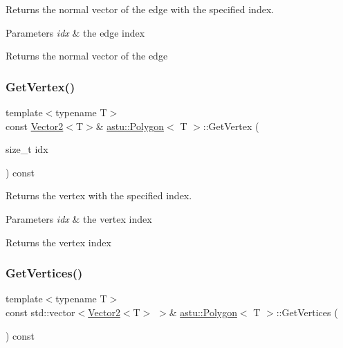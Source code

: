 Returns the normal vector of the edge with the specified index.


\begin{DoxyParams}{Parameters}
{\em idx} & the edge index \\
\hline
\end{DoxyParams}
\begin{DoxyReturn}{Returns}
the normal vector of the edge 
\end{DoxyReturn}
\mbox{\label{classastu_1_1Polygon_ad06d8f363e793f0b6b44af115330d26c}} 
\subsubsection{\texorpdfstring{Get\+Vertex()}{GetVertex()}}
{\footnotesize\ttfamily template$<$typename T$>$ \\
const \hyperlink{classastu_1_1Vector2}{Vector2}$<$T$>$\& \hyperlink{classastu_1_1Polygon}{astu\+::\+Polygon}$<$ T $>$\+::Get\+Vertex (\begin{DoxyParamCaption}\item[{size\+\_\+t}]{idx }\end{DoxyParamCaption}) const\hspace{0.3cm}{\ttfamily [inline]}}

Returns the vertex with the specified index.


\begin{DoxyParams}{Parameters}
{\em idx} & the vertex index \\
\hline
\end{DoxyParams}
\begin{DoxyReturn}{Returns}
the vertex index 
\end{DoxyReturn}
\mbox{\label{classastu_1_1Polygon_aa96aa72691eac81bf46d4e0ac2109a46}} 
\subsubsection{\texorpdfstring{Get\+Vertices()}{GetVertices()}}
{\footnotesize\ttfamily template$<$typename T$>$ \\
const std\+::vector$<$\hyperlink{classastu_1_1Vector2}{Vector2}$<$T$>$ $>$\& \hyperlink{classastu_1_1Polygon}{astu\+::\+Polygon}$<$ T $>$\+::Get\+Vertices (\begin{DoxyParamCaption}{ }\end{DoxyParamCaption}) const\hspace{0.3cm}{\ttfamily [inline]}}

